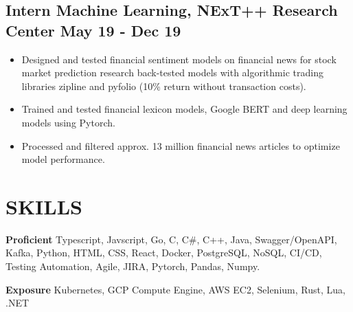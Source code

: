 \documentclass[12pts]{article}
\begin{document}
\subsection*{ Intern Machine Learning, NExT++ Research Center \href{https://github.com/GelliFrancesco/assetpriceprediction}{\faGithub} \hfill May 19 - Dec 19}
\begin{itemize}
    \item Designed and tested financial sentiment models on financial news for stock market prediction research back-tested models with algorithmic trading libraries zipline and pyfolio (10\% return without transaction costs).
    \item Trained and tested financial lexicon models, Google BERT and deep learning models using Pytorch.
    \item Processed and filtered approx. 13 million financial news articles to optimize model performance.
\end{itemize}

\section*{SKILLS}
{\large \bf Proficient}
Typescript, Javscript, Go, C, C\#, C++, Java, Swagger/OpenAPI, Kafka, Python, HTML, CSS, React, Docker,
PostgreSQL, NoSQL, CI/CD, Testing Automation, Agile, JIRA,
Pytorch, Pandas, Numpy.

{\large \bf Exposure}
Kubernetes, GCP Compute Engine, AWS EC2, Selenium, Rust, Lua, .NET
\end{document}
